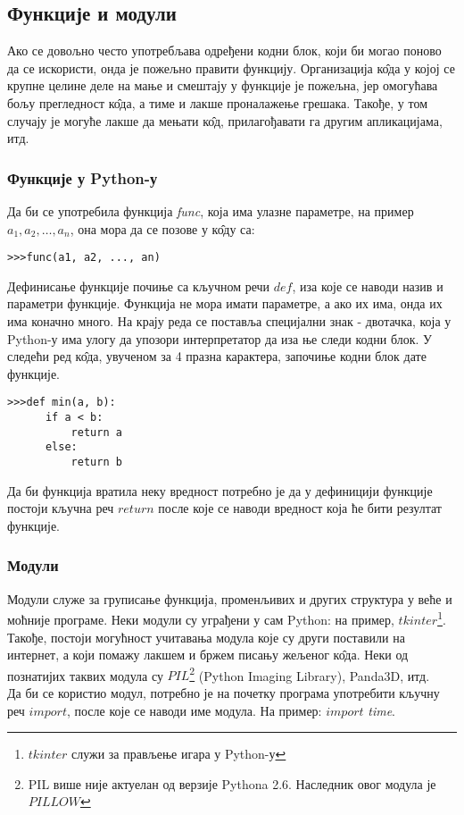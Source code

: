 \subsection{Функције и модули}
		Ако се довољно често употребљава одређени кодни блок, који би могао поново да се искористи, онда је пожељно правити функцију. Организација к\^{о}да у којој се крупне целине деле на мање и смештају у функције је пожељна, јер омогућава бољу прегледност к\^{о}да, а тиме и лакше проналажење грешака. Такође, у том случају је могуће лакше да мењати к\^{о}д, прилагођавати га другим апликацијама, итд.
		\subsubsection{Функције у Python-у}
		Да би се употребила функција \emph{func}, која има улазне параметре, на пример $a_{1}, a_{2},\dots, a_{n}$, она мора да се позове у к\^{о}ду са:
		\begin{lstlisting}
>>>func(a1, a2, ..., an)
		\end{lstlisting}  
		Дефинисање функције почиње са кључном речи $def$, иза које се наводи назив и параметри функције. Функција не мора имати параметре, а ако их има, онда их има коначно много. На крају реда се поставља специјални знак - двотачка, која у Python-у има улогу да упозори интерпретатор да иза ње следи кодни блок. У следећи ред к\^{о}да, увученом за 4 празна карактера, започиње кодни блок дате функције. 
		\begin{lstlisting}[caption = Дефинисање функције, label = func]
>>>def min(a, b):
      if a < b:
          return a
      else:
          return b
		\end{lstlisting}
		Да би функција вратила неку вредност потребно је да у дефиницији функције постоји кључна реч $return$ после које се наводи вредност која ће бити резултат функције. 
		\subsubsection{Модули}
		Модули служе за груписање функција, променљивих и других структура у веће и моћније програме. Неки модули су уграђени у сам Python: на пример, $tkinter$\footnote{$tkinter$ служи за прављење игара у Python-у}. Такође, постоји могућност учитавања модула које су други поставили на интернет, а који помажу лакшем и бржем писању жељеног к\^{о}да. Неки од познатијих таквих модула су $PIL$\footnote{PIL више није актуелан од верзије Pythona 2.6. Наследник овог модула је $PILLOW$}  (Python Imaging Library), Panda3D, итд.\\
		 Да би се користио модул, потребно је на почетку програма употребити кључну реч $import$, после које се наводи име модула. На пример: $import$ \emph{time}.